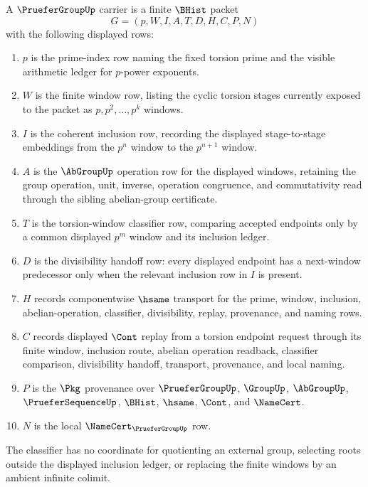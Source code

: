 \begin{definition}
\label{def:pruefer-group-carrier}
A $\PrueferGroupUp$ carrier is a finite $\BHist$ packet
$$
G=(p,W,I,A,T,D,H,C,P,N)
$$
with the following displayed rows:
\begin{enumerate}
\item $p$ is the prime-index row naming the fixed torsion prime and the visible arithmetic ledger for $p$-power exponents.
\item $W$ is the finite window row, listing the cyclic torsion stages currently exposed to the packet as $p,p^2,\ldots,p^k$ windows.
\item $I$ is the coherent inclusion row, recording the displayed stage-to-stage embeddings from the $p^n$ window to the $p^{n+1}$ window.
\item $A$ is the $\AbGroupUp$ operation row for the displayed windows, retaining the group operation, unit, inverse, operation congruence, and commutativity read through the sibling abelian-group certificate.
\item $T$ is the torsion-window classifier row, comparing accepted endpoints only by a common displayed $p^m$ window and its inclusion ledger.
\item $D$ is the divisibility handoff row: every displayed endpoint has a next-window predecessor only when the relevant inclusion row in $I$ is present.
\item $H$ records componentwise $\hsame$ transport for the prime, window, inclusion, abelian-operation, classifier, divisibility, replay, provenance, and naming rows.
\item $C$ records displayed $\Cont$ replay from a torsion endpoint request through its finite window, inclusion route, abelian operation readback, classifier comparison, divisibility handoff, transport, provenance, and local naming.
\item $P$ is the $\Pkg$ provenance over $\PrueferGroupUp$, $\GroupUp$, $\AbGroupUp$, $\PrueferSequenceUp$, $\BHist$, $\hsame$, $\Cont$, and $\NameCert$.
\item $N$ is the local $\NameCert_{\PrueferGroupUp}$ row.
\end{enumerate}
The classifier has no coordinate for quotienting an external group, selecting roots outside the displayed inclusion ledger, or replacing the finite windows by an ambient infinite colimit.
\end{definition}

